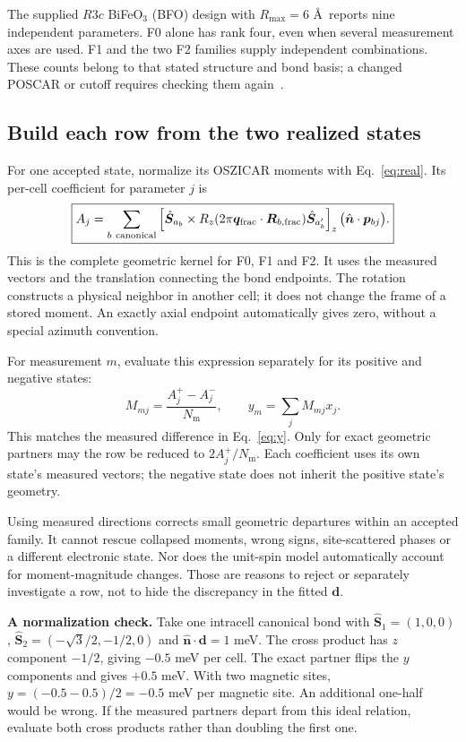 \documentclass[11pt,a4paper]{article}
\numberwithin{equation}{section}
\newcommand{\vct}[1]{\bm{#1}}
\newcommand{\nh}{\hat{\vct n}}
\newcommand{\qh}{\vct q}
\newcommand{\Nm}{N_{\mathrm m}}
\newcommand{\code}[1]{\texttt{\detokenize{#1}}}
\begin{document}
The supplied $R3c$ BiFeO$_3$ (BFO) design with $R_{\max}=6$ \AA\ reports nine independent
parameters. F0 alone has rank four, even when several measurement axes
are used. F1 and the two F2 families supply independent combinations.
These counts belong to that stated structure and bond basis; a changed
POSCAR or cutoff requires checking them again~\cite{projectcore}.

\subsection{Build each row from the two realized states}

For one accepted state, normalize its OSZICAR \code{M_int} moments
with Eq.~\eqref{eq:real}. Its per-cell coefficient for parameter $j$ is
\begin{equation}\label{eq:A}
 \boxed{A_j=\sum_{b\ {\rm canonical}}
 \left[\hat{\vct S}_{a_b}\times
 R_z(2\pi\qh_{\rm frac}\cdot\vct R_{b,\rm frac})
 \hat{\vct S}_{a'_b}\right]_z
 \bigl(\nh\cdot\vct p_{bj}\bigr).}
\end{equation}
This is the complete geometric kernel for F0, F1 and F2. It uses the
measured vectors and the translation connecting the bond endpoints.
The rotation constructs a physical neighbor in another cell; it does
not change the frame of a stored moment. An exactly axial endpoint
automatically gives zero, without a special azimuth convention.


For measurement $m$, evaluate this expression separately for its positive
and negative states:
\begin{equation}\label{eq:M}
 \boxed{M_{mj}=\frac{A_j^+-A_j^-}{\Nm},
 \qquad y_m=\sum_j M_{mj}x_j.}
\end{equation}
This matches the measured difference in Eq.~\eqref{eq:y}.
Only for exact geometric partners may the row be reduced to
$2A_j^+/\Nm$. Each coefficient uses its own state's measured vectors;
the negative state does not inherit the positive state's geometry.

Using measured directions corrects small geometric departures within an
accepted family. It cannot rescue collapsed moments, wrong signs,
site-scattered phases or a different electronic state. Nor does the
unit-spin model automatically account for moment-magnitude changes.
Those are reasons to reject or separately investigate a row, not to
hide the discrepancy in the fitted $\vct d$.

\textbf{A normalization check.}
Take one intracell canonical bond with
$\hat{\vct S}_1=(1,0,0)$,
$\hat{\vct S}_2=(-\sqrt3/2,-1/2,0)$ and
$\nh\cdot\vct d=1$ meV.
The cross product has $z$ component $-1/2$, giving $-0.5$ meV per cell.
The exact partner flips the $y$ components and gives $+0.5$ meV.
With two magnetic sites, $y=(-0.5-0.5)/2=-0.5$ meV per magnetic site.
An additional one-half would be wrong. If the measured partners depart
from this ideal relation, evaluate both cross products rather than
doubling the first one.
\end{document}
